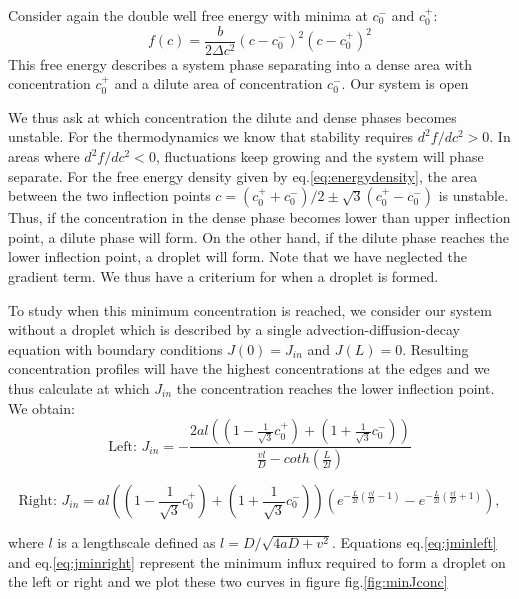 \documentclass{Dissertate}
\begin{document}
Consider again the double well free energy with minima at \(c_0^-\) and
\(c_0^+\): \begin{equation}
f(c) = \frac{b}{2\Delta c^2}(c-c_0^-)^2(c-c_0^+)^2
\label{eq:energydensity}\end{equation} This free energy describes a
system phase separating into a dense area with concentration \(c_0^+\)
and a dilute area of concentration \(c_0^-\). Our system is open

We thus ask at which concentration the dilute and dense phases becomes
unstable. For the thermodynamics we know that stability requires
\(d^2f/dc^2>0\). In areas where \(d^2f/dc^2<0\), fluctuations keep
growing and the system will phase separate. For the free energy density
given by eq.\ref{eq:energydensity}, the area between the two inflection
points \(c=(c_0^++c_0^-)/2\pm\sqrt{3}(c_0^+-c_0^-)\) is unstable. Thus,
if the concentration in the dense phase becomes lower than upper
inflection point, a dilute phase will form. On the other hand, if the
dilute phase reaches the lower inflection point, a droplet will form.
Note that we have neglected the gradient term. We thus have a criterium
for when a droplet is formed.

To study when this minimum concentration is reached, we consider our
system without a droplet which is described by a single
advection-diffusion-decay equation with boundary conditions
\(J(0)=J_{in}\) and \(J(L)=0\). Resulting concentration profiles will
have the highest concentrations at the edges and we thus calculate at
which \(J_{in}\) the concentration reaches the lower inflection point.
We obtain: \begin{equation}
\text{Left:  }J_{in} = - \frac{ 2al((1-\frac{1}{\sqrt{3}}c_0^+)+(1+\frac{1}{\sqrt{3}}c_0^-))}{\frac{vl}{D}-coth(\frac{L}{2l})}
\label{eq:jminleft}\end{equation}

\begin{equation}
\text{Right: } J_{in} =al((1-\frac{1}{\sqrt{3}}c_0^+)+(1+\frac{1}{\sqrt{3}}c_0^-))\left(e^{-\frac{L}{2l}(\frac{vl}{D}-1)}-e^{-\frac{L}{2l}(\frac{vl}{D}+1)}\right),
\label{eq:jminright}\end{equation}

where \(l\) is a lengthscale defined as \(l=D/\sqrt{4aD+v^2}\).
Equations eq.\ref{eq:jminleft} and eq.\ref{eq:jminright} represent the
minimum influx required to form a droplet on the left or right and we
plot these two curves in figure fig.\ref{fig:minJconc}
\end{document}
